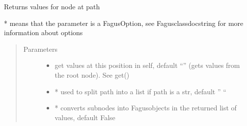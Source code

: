 \documentclass[a4paper,10pt,english]{sphinxmanual}
\begin{document}
\begin{fulllineitems}
\begin{fulllineitems}
\begin{quote}
\begin{description}
\end{description}\end{quote}

\end{fulllineitems}


\begin{fulllineitems}
\label{\detokenize{fagus:fagus.Fagus.values}}
\pysigstartsignatures
{}
\pysigstopsignatures
\sphinxAtStartPar
Returns values for node at path

\sphinxAtStartPar
* means that the parameter is a FagusOption, see Fagus\sphinxhyphen{}class\sphinxhyphen{}docstring for more information about options
\begin{quote}\begin{description}
\item[{Parameters}] \leavevmode\begin{itemize}
\item {}
\sphinxAtStartPar
{} \textendash{} get values at this position in self, default “” (gets values from the root node). See get()

\item {}
\sphinxAtStartPar
{} \textendash{} * used to split path into a list if path is a str, default ” “

\item {}
\sphinxAtStartPar
{} \textendash{} * converts sub\sphinxhyphen{}nodes into Fagus\sphinxhyphen{}objects in the returned list of values, default False


\end{itemize}
\end{description}
\end{quote}
\end{fulllineitems}
\end{fulllineitems}
\end{document}
